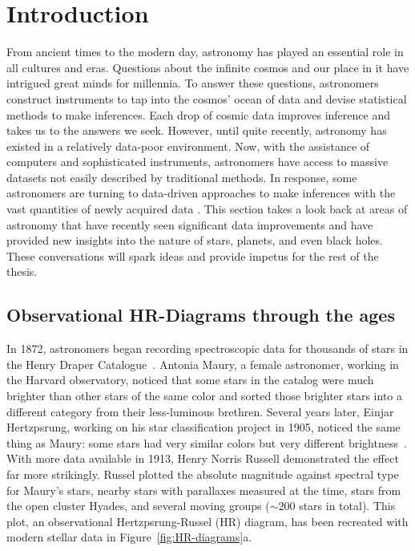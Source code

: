  \chapter{Introduction}
\label{cp.intro}

From ancient times to the modern day, astronomy has played an essential role in all cultures and eras.
Questions about the infinite cosmos and our place in it have intrigued great minds for millennia.
To answer these questions, astronomers construct instruments to tap into the cosmos' ocean of data and devise statistical methods to make inferences.
Each drop of cosmic data improves inference and takes us to the answers we seek.
However, until quite recently, astronomy has existed in a relatively data-poor environment. 
Now, with the assistance of computers and sophisticated instruments, astronomers have access to massive datasets not easily described by traditional methods.
In response, some astronomers are turning to data-driven approaches to make inferences with the vast quantities of newly acquired data .
This section takes a look back at areas of astronomy that have recently seen significant data improvements and have provided new insights into the nature of stars, planets, and even black holes.
These conversations will spark ideas and provide impetus for the rest of the thesis.


\section{Observational HR-Diagrams through the ages}

In 1872, astronomers began recording spectroscopic data for thousands of stars in the Henry Draper Catalogue~\citeme.
Antonia Maury, a female astronomer, working in the Harvard observatory, noticed that some stars in the catalog were much brighter than other stars of the same color and sorted those brighter stars into a different category from their less-luminous brethren. 
Several years later, Einjar Hertzpsrung, working on his star classification project in 1905, noticed the same thing as Maury: some stars had very similar colors but very different brightness~\citeme.
With more data available in 1913, Henry Norris Russell demonstrated the effect far more strikingly. 
Russel plotted the absolute magnitude against spectral type for Maury's stars, nearby stars with parallaxes measured at the time, stars from the open cluster Hyades, and several moving groups ($\sim200$ stars in total). 
This plot, an observational Hertzpsrung-Russel (HR) diagram, has been recreated with modern stellar data in Figure~\ref{fig:HR-diagrams}a.

